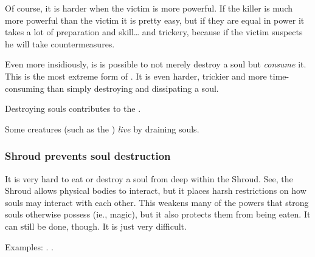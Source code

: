 Of course, it is harder when the victim is more powerful. 
If the killer is much more powerful than the victim it is pretty easy, but if they are equal in power it takes a lot of preparation and skill\ldots{} and trickery, because if the victim suspects he will take countermeasures. 

Even more insidiously, is is possible to not merely destroy a soul but \emph{consume} it. 
This is the most extreme form of . 
It is even harder, trickier and more time-consuming than simply destroying and dissipating a soul. 

Destroying souls contributes to the . 

Some creatures (such as the ) \emph{live} by draining souls. 






\subsubsection{Shroud prevents soul destruction}
It is very hard to eat or destroy a soul from deep within the Shroud. 
See, the Shroud allows physical bodies to interact, but it places harsh restrictions on how souls may interact with each other. 
This weakens many of the powers that strong souls otherwise possess (ie., magic), but it also protects them from being eaten. 
It can still be done, though. 
It is just very difficult. 

Examples: 
. 
. 
 

























